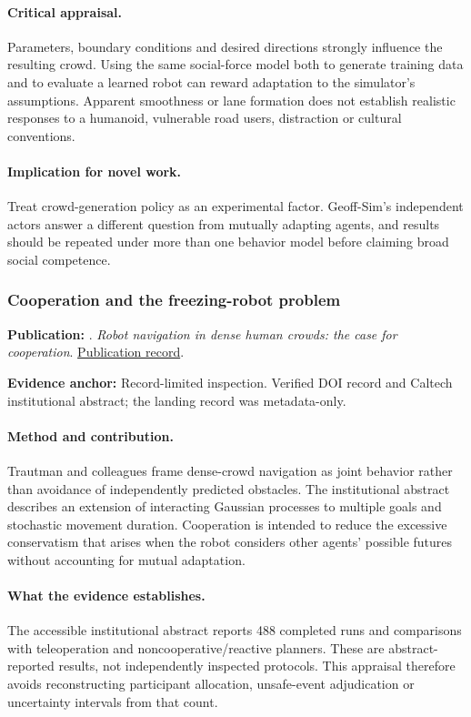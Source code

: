 \paragraph{Critical appraisal.} Parameters, boundary conditions and desired directions strongly influence the resulting crowd. Using the same social-force model both to generate training data and to evaluate a learned robot can reward adaptation to the simulator's assumptions. Apparent smoothness or lane formation does not establish realistic responses to a humanoid, vulnerable road users, distraction or cultural conventions.

\paragraph{Implication for novel work.} Treat crowd-generation policy as an experimental factor. Geoff-Sim's independent actors answer a different question from mutually adapting agents, and results should be repeated under more than one behavior model before claiming broad social competence.

\subsubsection{Cooperation and the freezing-robot problem}\label{paper:freezing}
\textbf{Publication:} \citet{freezing}. \emph{Robot navigation in dense human crowds: the case for cooperation}. \href{https://doi.org/10.1109/icra.2013.6630866}{Publication record}.

\textbf{Evidence anchor:} Record-limited inspection. Verified DOI record and Caltech institutional abstract; the landing record was metadata-only.

\paragraph{Method and contribution.} Trautman and colleagues frame dense-crowd navigation as joint behavior rather than avoidance of independently predicted obstacles. The institutional abstract describes an extension of interacting Gaussian processes to multiple goals and stochastic movement duration. Cooperation is intended to reduce the excessive conservatism that arises when the robot considers other agents' possible futures without accounting for mutual adaptation.

\paragraph{What the evidence establishes.} The accessible institutional abstract reports 488 completed runs and comparisons with teleoperation and noncooperative/reactive planners. These are abstract-reported results, not independently inspected protocols. This appraisal therefore avoids reconstructing participant allocation, unsafe-event adjudication or uncertainty intervals from that count.

